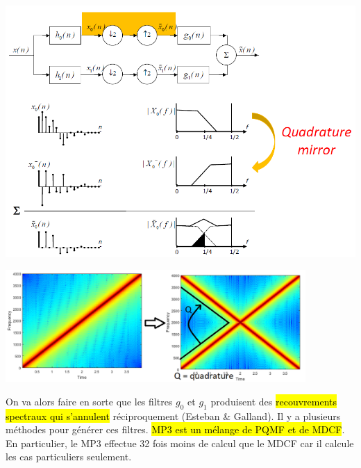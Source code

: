 \documentclass[letterpaper, 12pt]{article}
\begin{document}
				\begin{center}
					\includegraphics[width=5.5in]{Images/quadrature}
				\end{center}
				\begin{center}
					\includegraphics[width=4.5in]{Images/chirp}
				\end{center}
				On va alors faire en sorte que les filtres $g_0$ et $g_1$ produisent des \hl{recouvrements spectraux qui s'annulent} 
				réciproquement (Esteban \& Galland). Il y a plusieurs méthodes pour générer ces filtres. \hl{MP3 est un mélange de PQMF et 
				de MDCF}. En particulier, le MP3 effectue 32 fois moins de calcul que le MDCF car il calcule les cas particuliers 
				seulement.
\end{document}
